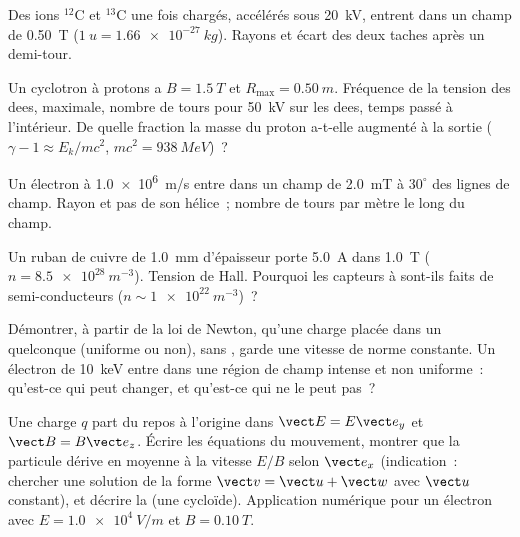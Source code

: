 \begin{exercise}[$\star\star$]\label{exo:b1:charged-particles:6}
Des ions $^{12}$C et $^{13}$C une fois chargés, accélérés sous
\qty{20}{kV}, entrent dans un champ de \qty{0.50}{T} ($\qty{1}{u} = \qty{1.66e-27}{kg}$).
Rayons et écart des deux taches après un demi-tour.
\end{exercise}

\begin{exercise}[$\star\star$]\label{exo:b1:charged-particles:7}
Un cyclotron à protons a $B = \qty{1.5}{T}$ et $R_{\max} = \qty{0.50}{m}$.
Fréquence de la tension des dees,  maximale, nombre de
tours pour \qty{50}{kV} sur les dees, temps passé à l'intérieur. De
quelle fraction la masse du proton a-t-elle augmenté à la sortie
($\gamma - 1 \approx E_k/mc^2$, $mc^2 = \qty{938}{MeV}$)~?
\end{exercise}

\begin{exercise}[$\star\star$]\label{exo:b1:charged-particles:8}
Un électron à \qty{1.0e6}{m/s} entre dans un champ de \qty{2.0}{mT} à
$30^\circ$ des lignes de champ. Rayon et pas de son hélice~; nombre de
tours par mètre le long du champ.
\end{exercise}

\begin{exercise}[$\star\star$]\label{exo:b1:charged-particles:9}
Un ruban de cuivre de \qty{1.0}{mm} d'épaisseur porte \qty{5.0}{A} dans
\qty{1.0}{T} ($n = \qty{8.5e28}{m^{-3}}$). Tension de Hall. Pourquoi les
capteurs à  sont-ils faits de semi-conducteurs
($n \sim \qty{1e22}{m^{-3}}$)~?
\end{exercise}

\begin{exercise}[$\star\star\star$]\label{exo:b1:charged-particles:10}
Démontrer, à partir de la loi de Newton, qu'une charge placée dans un
 quelconque (uniforme ou non), sans ,
garde une vitesse de norme constante. Un électron de \qty{10}{keV} entre
dans une région de champ intense et non uniforme~: qu'est-ce qui peut
changer, et qu'est-ce qui ne le peut pas~?
\end{exercise}

\begin{exercise}[$\star\star\star$]\label{exo:b1:charged-particles:11}
Une charge $q$ part du repos à l'origine dans $\vect E = E\vect e_y$ et
$\vect B = B\vect e_z$. Écrire les équations du mouvement, montrer que la
particule dérive en moyenne à la vitesse $E/B$ selon $\vect e_x$
(indication~: chercher une solution de la forme
$\vect v = \vect u + \vect w$ avec $\vect u$ constant), et décrire la
 (une cycloïde). Application numérique pour un électron avec
$E = \qty{1.0e4}{V/m}$ et $B = \qty{0.10}{T}$.
\end{exercise}

